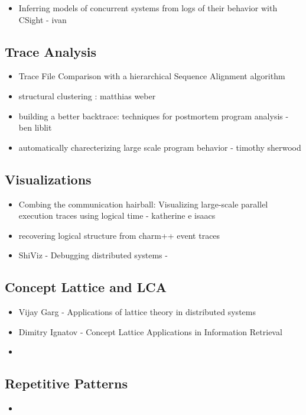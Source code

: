 \begin{itemize}
\item Inferring models of concurrent systems from logs of their behavior with CSight - ivan \cite{beschastnikh-csight}
\end{itemize}




\subsection{Trace Analysis}


\begin{itemize}
\item Trace File Comparison with a hierarchical Sequence Alignment algorithm \cite{weber-seqAlign}
\item structural clustering : matthias weber \cite{weberStructural}
\item building a better backtrace: techniques for postmortem program analysis - ben liblit \cite{liblit02}
\item automatically charecterizing large scale program behavior - timothy sherwood \cite{sherwood02}
\end{itemize}


\subsection{Visualizations}


\begin{itemize}
\item Combing the communication hairball: Visualizing large-scale parallel execution traces using logical time - katherine e isaacs \cite{ravel}
\item recovering logical structure from charm++ event traces \cite{charmVis}
\item ShiViz - Debugging distributed systems - \cite{shiviz}
\end{itemize}



\subsection{Concept Lattice and LCA}


\begin{itemize}
\item Vijay Garg - Applications of lattice theory in distributed systems

\item Dimitry Ignatov \cite{ignatov} - Concept Lattice Applications in Information Retrieval

\item \cite{clbook} \cite{clconst} \cite{bender05} \citep{latticeForDistConst} \cite{diff-myers}
\end{itemize}

\subsection{Repetitive Patterns}


\begin{itemize}
\item \cite{kmruse} \cite{kmr} \cite{nakamura_fast_2013} \cite{crochemore_jewels_2002} \citep{Crochemore:1994:TA:199269}
\end{itemize}


